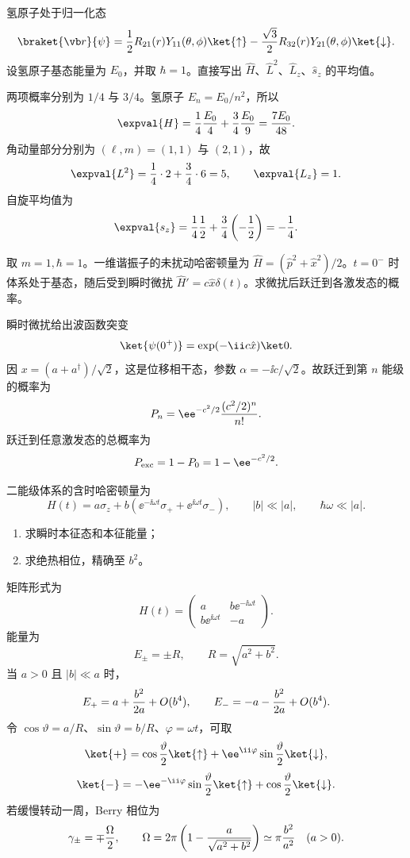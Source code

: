 
\begin{question}
氢原子处于归一化态
\[
  \braket{\vb r}{\psi}={1\over2}R_{21}(r)Y_{11}(\theta,\phi)\ket{\uparrow}
  -{\sqrt3\over2}R_{32}(r)Y_{21}(\theta,\phi)\ket{\downarrow}.
\]
设氢原子基态能量为 $E_0$，并取 $\hbar=1$。直接写出 $\hat H$、$\hat L^2$、$\hat L_z$、$\hat s_z$ 的平均值。
\begin{solution}
两项概率分别为 $1/4$ 与 $3/4$。氢原子 $E_n=E_0/n^2$，所以
\[
  \expval{H}={1\over4}{E_0\over4}+{3\over4}{E_0\over9}={7E_0\over48}.
\]
角动量部分分别为 $(\ell,m)=(1,1)$ 与 $(2,1)$，故
\[
  \expval{L^2}={1\over4}\cdot 2+{3\over4}\cdot 6=5,
  \qquad \expval{L_z}=1.
\]
自旋平均值为
\[
  \expval{s_z}={1\over4}{1\over2}+{3\over4}\left(-{1\over2}\right)=-{1\over4}.
\]
\end{solution}
\end{question}

\begin{question}
取 $m=1,\hbar=1$。一维谐振子的未扰动哈密顿量为 $\hat H=(\hat p^2+\hat x^2)/2$。$t=0^-$ 时体系处于基态，随后受到瞬时微扰 $\hat H'=c\hat x\delta(t)$。求微扰后跃迁到各激发态的概率。
\begin{solution}
瞬时微扰给出波函数突变
\[
  \ket{\psi(0^+)}=\exp(-\ii c\hat x)\ket0.
\]
因 $x=(a+a^\dagger)/\sqrt2$，这是位移相干态，参数 $\alpha=-\ii c/\sqrt2$。故跃迁到第 $n$ 能级的概率为
\[
  P_n=\ee^{-c^2/2}{(c^2/2)^n\over n!}.
\]
跃迁到任意激发态的总概率为
\[
  P_{\rm exc}=1-P_0=1-\ee^{-c^2/2}.
\]
\end{solution}
\end{question}

\begin{question}
二能级体系的含时哈密顿量为
\[
  H(t)=a\sigma_z+b\left(\ee^{-\ii\omega t}\sigma_+ + \ee^{\ii\omega t}\sigma_-\right),
  \qquad |b|\ll |a|,
  \qquad \hbar\omega\ll |a|.
\]
\begin{enumerate}
  \item 求瞬时本征态和本征能量；
  \item 求绝热相位，精确至 $b^2$。
\end{enumerate}
\begin{solution}
矩阵形式为
\[
  H(t)=\begin{pmatrix}a&b\ee^{-\ii\omega t}\\ b\ee^{\ii\omega t}&-a\end{pmatrix}.
\]
能量为
\[
  E_\pm=\pm R,
  \qquad R=\sqrt{a^2+b^2}.
\]
当 $a>0$ 且 $|b|\ll a$ 时，
\[
  E_+=a+{b^2\over 2a}+O(b^4),
  \qquad E_-=-a-{b^2\over 2a}+O(b^4).
\]
令 $\cos\vartheta=a/R$、$\sin\vartheta=b/R$、$\varphi=\omega t$，可取
\[
  \ket{+}=\cos{\vartheta\over2}\ket{\uparrow}+\ee^{\ii\varphi}\sin{\vartheta\over2}\ket{\downarrow},
\]
\[
  \ket{-}=-\ee^{-\ii\varphi}\sin{\vartheta\over2}\ket{\uparrow}+\cos{\vartheta\over2}\ket{\downarrow}.
\]
若缓慢转动一周，Berry 相位为
\[
  \gamma_\pm=\mp{\Omega\over2},
  \qquad \Omega=2\pi\left(1-{a\over\sqrt{a^2+b^2}}\right)
  \simeq \pi {b^2\over a^2}\quad (a>0).
\]
\end{solution}
\end{question}

